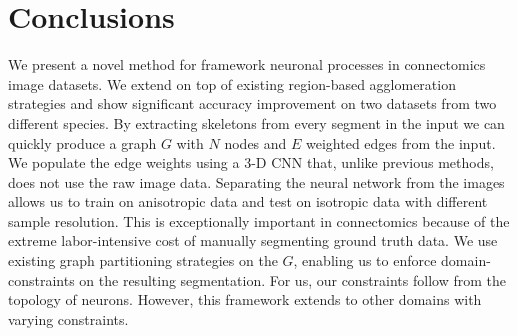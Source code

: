 \section{Conclusions}

We present a novel method for framework neuronal processes in connectomics image datasets.
We extend on top of existing region-based agglomeration strategies and show significant accuracy improvement on two datasets from two different species. 
By extracting skeletons from every segment in the input we can quickly produce a graph $G$ with $N$ nodes and $E$ weighted edges from the input. 
We populate the edge weights using a 3-D CNN that, unlike previous methods, does not use the raw image data.
Separating the neural network from the images allows us to train on anisotropic data and test on isotropic data with different sample resolution. 
This is exceptionally important in connectomics because of the extreme labor-intensive cost of manually segmenting ground truth data. 
We use existing graph partitioning strategies on the $G$, enabling us to enforce domain-constraints on the resulting segmentation.
For us, our constraints follow from the topology of neurons.
However, this framework extends to other domains with varying constraints. 